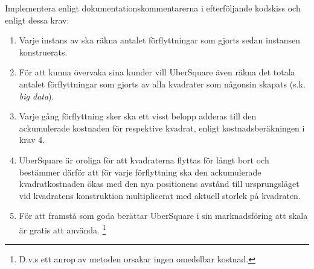 \Subtask Implementera  enligt dokumentationskommentarerna i efterföljande kodskiss och enligt dessa krav:

\begin{enumerate}%
   \item Varje instans av  ska räkna antalet förflyttningar som gjorts sedan instansen konstruerats.

   \item För att kunna övervaka sina kunder vill UberSquare även räkna det totala antalet förflyttningar som gjorts av alla kvadrater som någonsin skapats (s.k. \emph{big data}).

  \item Varje gång förflyttning sker ska ett visst belopp adderas till den ackumulerade kostnaden för respektive kvadrat, enligt kostnadsberäkningen i krav 4.

  \item UberSquare är oroliga för att kvadraterna flyttas för långt bort och bestämmer därför att för varje förflyttning ska den ackumulerade kvadratkostnaden ökas med den nya positionens avstånd till ursprungsläget vid kvadratens konstruktion multiplicerat med aktuell storlek på kvadraten.

  \item För att framstå som goda berättar UberSquare i sin marknadsföring att skala är gratis att använda. \footnote{D.v.s ett anrop av metoden  orsakar ingen omedelbar kostnad.}
\end{enumerate}

